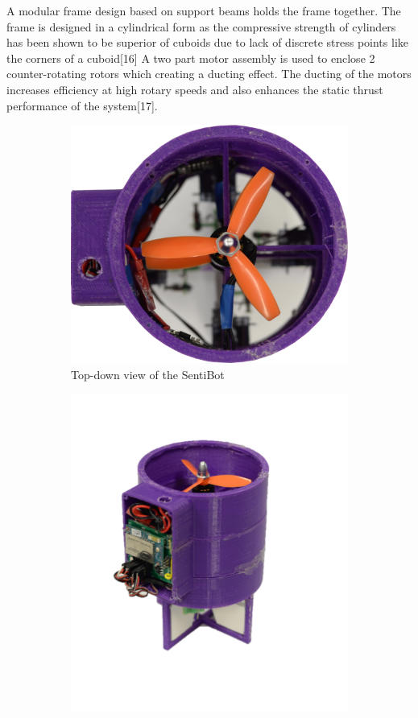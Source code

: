 \documentclass[12pt]{article}
\begin{document}
A modular frame design based on support beams holds the frame together. The frame is designed in a cylindrical form as the compressive strength of cylinders has been shown to be superior of cuboids due to lack of discrete stress points like the corners of a cuboid[16] A two part motor assembly is used to enclose 2 counter-rotating rotors which creating a ducting effect. The ducting of the motors increases efficiency at high rotary speeds and also enhances the static thrust performance of the system[17].

\begin{figure}
	\centering
	\begin{subfigure}{0.5\textwidth}
		\centering
		\includegraphics[width=0.9\linewidth]{sb-topdown.png}
		\caption{Top-down view of the SentiBot}
		\label{fig:sb-topdown}
	\end{subfigure}%
	\begin{subfigure}{0.5\textwidth}
		\centering
		\includegraphics[width=0.9\linewidth]{sb-side.png}

\end{subfigure}
\end{figure}
\end{document}
